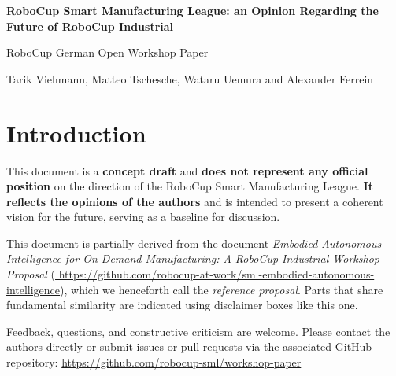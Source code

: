 \documentclass[letterpaper, 11pt]{extarticle}
\begin{document}
\begin{Large}
    \textsf{\textbf{RoboCup Smart Manufacturing League: an Opinion Regarding the Future of RoboCup Industrial}}

RoboCup German Open Workshop Paper

\end{Large}

\vspace{1ex}
Tarik Viehmann, Matteo Tschesche, Wataru Uemura and Alexander Ferrein





\section{Introduction}
\begin{tcolorbox}[disclaimerbox, title=Disclaimer]
This document is a \textbf{concept draft} and \textbf{does not represent any official position} on the direction of the RoboCup Smart Manufacturing League.  
\textbf{It reflects the opinions of the authors} and is intended to present a coherent vision for the future, serving as a baseline for discussion.  

This document is partially derived from the document \emph{Embodied Autonomous Intelligence for On-Demand
Manufacturing: A RoboCup Industrial Workshop Proposal} (\url{ https://github.com/robocup-at-work/sml-embodied-autonomous-intelligence}), which we henceforth call the \emph{reference proposal}. Parts that share fundamental similarity are indicated using disclaimer boxes like this one. 


Feedback, questions, and constructive criticism are welcome. Please contact the authors directly or submit issues or pull requests via the associated GitHub repository:  
\url{https://github.com/robocup-sml/workshop-paper}
\end{tcolorbox}

\end{document}
